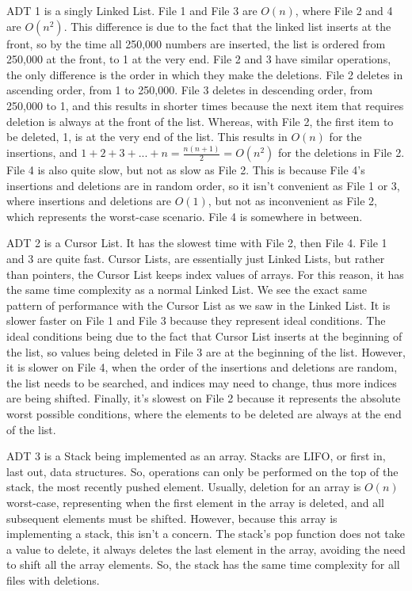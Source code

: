 \documentclass[12pt]{article}
\begin{document}
\begin{doublespace}
    ADT 1 is a singly Linked List. File 1 and File 3 are $O(n)$, where File 2 and 4 are $O(n^2)$. This difference is due to the fact that the linked list inserts at the front, so by the time all 250,000 numbers are inserted, the list is ordered from 250,000 at the front, to 1 at the very end. File 2 and 3 have similar operations, the only difference is the order in which they make the deletions. File 2 deletes in ascending order, from 1 to 250,000. File 3 deletes in descending order, from 250,000 to 1, and this results in shorter times because the next item that requires deletion is always at the front of the list. Whereas, with File 2, the first item to be deleted, 1, is at the very end of the list. This results in $O(n)$ for the insertions, and $1+2+3+...+n=\frac{n(n+1)}{2}=O(n^2)$ for the deletions in File 2. File 4 is also quite slow, but not as slow as File 2. This is because File 4's insertions and deletions are in random order, so it isn't convenient as File 1 or 3, where insertions and deletions are $O(1)$, but not as inconvenient as File 2, which represents the worst-case scenario. File 4 is somewhere in between.

    ADT 2 is a Cursor List. It has the slowest time with File 2, then File 4. File 1 and 3 are quite fast. Cursor Lists, are essentially just Linked Lists, but rather than pointers, the Cursor List keeps index values of arrays. For this reason, it has the same time complexity as a normal Linked List. We see the exact same pattern of performance with the Cursor List as we saw in the Linked List. It is slower faster on File 1 and File 3 because they represent ideal conditions. The ideal conditions being due to the fact that Cursor List inserts at the beginning of the list, so values being deleted in File 3 are at the beginning of the list. However, it is slower on File 4, when the order of the insertions and deletions are random, the list needs to be searched, and indices may need to change, thus more indices are being shifted. Finally, it's slowest on File 2 because it represents the absolute worst possible conditions, where the elements to be deleted are always at the end of the list.

    ADT 3 is a Stack being implemented as an array. Stacks are LIFO, or first in, last out, data structures. So, operations can only be performed on the top of the stack, the most recently pushed element. Usually, deletion for an array is $O(n)$ worst-case, representing when the first element in the array is deleted, and all subsequent elements must be shifted. However, because this array is implementing a stack, this isn't a concern. The stack's pop function does not take a value to delete, it always deletes the last element in the array, avoiding the need to shift all the array elements. So, the stack has the same time complexity for all files with deletions.


\end{doublespace}
\end{document}
